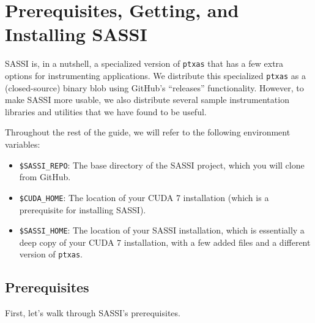 \section{Prerequisites, Getting, and Installing SASSI}

SASSI is, in a nutshell, a specialized version of \texttt{ptxas} that
has a few extra options for instrumenting applications.  We distribute
this specialized \texttt{ptxas} as a (closed-source) binary blob using
GitHub's ``releases'' functionality.  However, to make SASSI more
usable, we also distribute several sample instrumentation libraries
and utilities that we have found to be useful.

Throughout the rest of the guide, we will refer to the following
environment variables:
\begin{itemize}
\item \texttt{\$SASSI\_REPO}: The base directory of the SASSI project,
  which you will clone from GitHub.
\item \texttt{\$CUDA\_HOME}: The location of your CUDA 7 installation
  (which is a prerequisite for installing SASSI).
\item \texttt{\$SASSI\_HOME}: The location of your SASSI installation,
  which is essentially a deep copy of your CUDA 7 installation, with a
  few added files and a different version of \texttt{ptxas}.
\end{itemize}

\subsection{Prerequisites} 

First, let's walk through SASSI's prerequisites.

